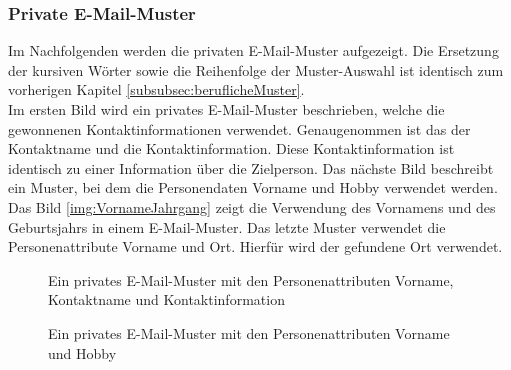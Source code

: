 		\subsubsection{Private E-Mail-Muster}
			Im Nachfolgenden werden die privaten E-Mail-Muster aufgezeigt. Die Ersetzung der kursiven Wörter sowie die Reihenfolge der Muster-Auswahl ist identisch zum vorherigen Kapitel \ref{subsubsec:beruflicheMuster}.\\
			Im ersten Bild wird ein privates E-Mail-Muster beschrieben, welche die gewonnenen Kontaktinformationen verwendet. Genaugenommen ist das der Kontaktname und die Kontaktinformation. Diese Kontaktinformation ist identisch zu einer Information über die Zielperson. Das nächste Bild beschreibt ein Muster, bei dem die Personendaten Vorname und Hobby verwendet werden. Das Bild \ref{img:VornameJahrgang} zeigt die Verwendung des Vornamens und des Geburtsjahrs in einem E-Mail-Muster. Das letzte Muster verwendet die Personenattribute Vorname und Ort. Hierfür wird  der gefundene Ort verwendet.\\
			\FloatBarrier
			
			\begin{figure}[h!]
			\caption{Ein privates E-Mail-Muster mit den Personenattributen Vorname, Kontaktname und Kontaktinformation}
			\end{figure}
			\FloatBarrier
			\begin{figure}[h!]
				\caption{Ein privates E-Mail-Muster mit den Personenattributen Vorname und Hobby}
			\end{figure}
		
